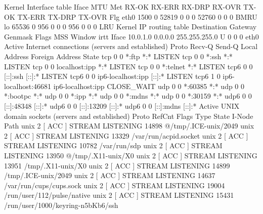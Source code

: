 Kernel Interface table
Iface   MTU Met   RX-OK RX-ERR RX-DRP RX-OVR    TX-OK TX-ERR TX-DRP TX-OVR Flg
eth0       1500 0     52819      0      0 0         52760      0      0      0 BMRU
lo        65536 0       956      0      0 0           956      0      0      0 LRU
Kernel IP routing table
Destination     Gateway         Genmask         Flags   MSS Window  irtt Iface
10.0.1.0        0.0.0.0         255.255.255.0   U         0 0          0 eth0
Active Internet connections (servers and established)
Proto Recv-Q Send-Q Local Address           Foreign Address         State      
tcp        0      0 *:ftp                   *:*                     LISTEN     
tcp        0      0 *:ssh                   *:*                     LISTEN     
tcp        0      0 localhost:ipp           *:*                     LISTEN     
tcp        0      0 *:telnet                *:*                     LISTEN     
tcp6       0      0 [::]:ssh                [::]:*                  LISTEN     
tcp6       0      0 ip6-localhost:ipp       [::]:*                  LISTEN     
tcp6       1      0 ip6-localhost:46681     ip6-localhost:ipp       CLOSE_WAIT 
udp        0      0 *:60385                 *:*                                
udp        0      0 *:bootpc                *:*                                
udp        0      0 *:ipp                   *:*                                
udp        0      0 *:mdns                  *:*                                
udp        0      0 *:30159                 *:*                                
udp6       0      0 [::]:48348              [::]:*                             
udp6       0      0 [::]:13209              [::]:*                             
udp6       0      0 [::]:mdns               [::]:*                             
Active UNIX domain sockets (servers and established)
Proto RefCnt Flags       Type       State         I-Node   Path
unix  2      [ ACC ]     STREAM     LISTENING     14898    @/tmp/.ICE-unix/2049
unix  2      [ ACC ]     STREAM     LISTENING     13329    /var/run/acpid.socket
unix  2      [ ACC ]     STREAM     LISTENING     10782    /var/run/sdp
unix  2      [ ACC ]     STREAM     LISTENING     13950    @/tmp/.X11-unix/X0
unix  2      [ ACC ]     STREAM     LISTENING     13951    /tmp/.X11-unix/X0
unix  2      [ ACC ]     STREAM     LISTENING     14899    /tmp/.ICE-unix/2049
unix  2      [ ACC ]     STREAM     LISTENING     14637    /var/run/cups/cups.sock
unix  2      [ ACC ]     STREAM     LISTENING     19004    /run/user/112/pulse/native
unix  2      [ ACC ]     STREAM     LISTENING     15431    /run/user/1000/keyring-n5bKb6/ssh

